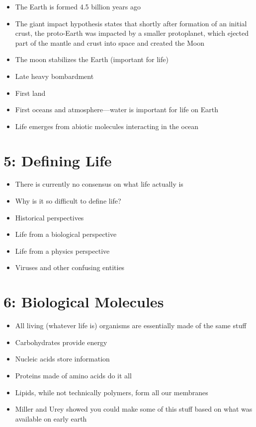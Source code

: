 \documentclass[
]{report}
\providecommand{\tightlist}{%
  \setlength{\itemsep}{0pt}\setlength{\parskip}{0pt}}
\providecommand{\tightlist}{%
  \setlength{\itemsep}{0pt}\setlength{\parskip}{0pt}}
\begin{document}
\begin{itemize}
\tightlist
\item
  The Earth is formed 4.5 billion years ago
\item
  The giant impact hypothesis states that shortly after formation of an initial crust, the proto-Earth was impacted by a smaller protoplanet, which ejected part of the mantle and crust into space and created the Moon
\item
  The moon stabilizes the Earth (important for life)
\item
  Late heavy bombardment
\item
  First land
\item
  First oceans and atmosphere---water is important for life on Earth
\item
  Life emerges from abiotic molecules interacting in the ocean
\end{itemize}

\hypertarget{defining-life}{%
\section*{5: Defining Life}\label{defining-life}}

\begin{itemize}
\tightlist
\item
  There is currently no consensus on what life actually is
\item
  Why is it so difficult to define life?
\item
  Historical perspectives
\item
  Life from a biological perspective
\item
  Life from a physics perspective
\item
  Viruses and other confusing entities
\end{itemize}

\hypertarget{biological-molecules}{%
\section*{6: Biological Molecules}\label{biological-molecules}}

\begin{itemize}
\tightlist
\item
  All living (whatever life is) organisms are essentially made of the same stuff
\item
  Carbohydrates provide energy
\item
  Nucleic acids store information
\item
  Proteins made of amino acids do it all
\item
  Lipids, while not technically polymers, form all our membranes
\item
  Miller and Urey showed you could make some of this stuff based on what was available on early earth
\end{itemize}
\end{document}
